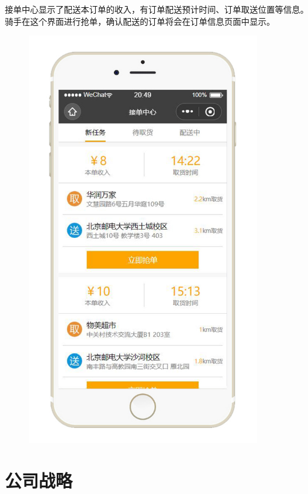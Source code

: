 \documentclass[UTF8,12pt]{ctexart}
\numberwithin{figure}{section}%
\begin{document}
\begin{spacing}{2}
\begin{itemize}
	接单中心显示了配送本订单的收入，有订单配送预计时间、订单取送位置等信息。骑手在这个界面进行抢单，确认配送的订单将会在订单信息页面中显示。	
	\begin{figure}[!htb]
		\centering
		\includegraphics[width=10cm]{fig/!9}
	\end{figure}
	
	
\end{itemize}

\section{公司战略}

\end{spacing}
\end{document}
